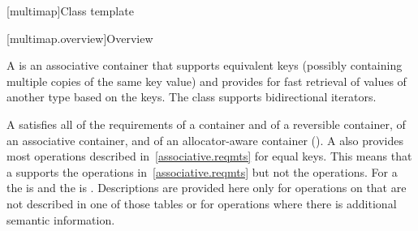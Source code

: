 [multimap]{Class template }

[multimap.overview]{Overview}

\pnum
{}%
A
is an associative container that supports equivalent keys (possibly containing multiple copies of
the same key value) and provides for fast retrieval of values of another type
based on the keys.
The
class
supports bidirectional iterators.

\pnum
A
 satisfies all of the requirements of a container and of a
reversible container, of an associative
container, and of an allocator-aware container
().
A
also provides most operations described in~\ref{associative.reqmts}
for equal keys.
This means that a
supports the
operations in~\ref{associative.reqmts}
but not the
operations.
For a
the
is
and the
is
.
Descriptions are provided here only for operations on
that are not described in one of those tables
or for operations where there is additional semantic information.

